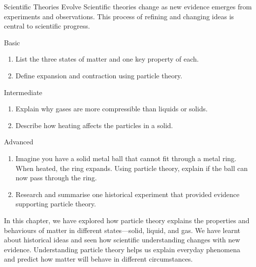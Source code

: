 \begin{keyconcept}{Scientific Theories Evolve}
Scientific theories change as new evidence emerges from experiments and observations. This process of refining and changing ideas is central to scientific progress.
\end{keyconcept}

\FloatBarrier
\1

\begin{tieredquestions}{Basic}
\begin{enumerate}
    \item List the three states of matter and one key property of each.
    \item Define expansion and contraction using particle theory.
\end{enumerate}
\end{tieredquestions}

\begin{tieredquestions}{Intermediate}
\begin{enumerate}
    \item Explain why gases are more compressible than liquids or solids.
    \item Describe how heating affects the particles in a solid.
\end{enumerate}
\end{tieredquestions}

\begin{tieredquestions}{Advanced}
\begin{enumerate}
    \item Imagine you have a solid metal ball that cannot fit through a metal ring. When heated, the ring expands. Using particle theory, explain if the ball can now pass through the ring.
    \item Research and summarise one historical experiment that provided evidence supporting particle theory.
\end{enumerate}
\end{tieredquestions}

\FloatBarrier
\1

In this chapter, we have explored how particle theory explains the properties and behaviours of matter in different states—solid, liquid, and gas. We have learnt about historical ideas and seen how scientific understanding changes with new evidence. Understanding particle theory helps us explain everyday phenomena and predict how matter will behave in different circumstances.
\FloatBarrier
